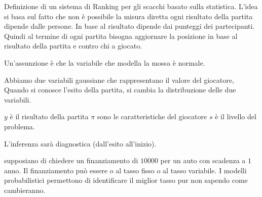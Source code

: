 \begin{esempio}
    Definizione di un sistema di Ranking per gli scacchi basato sulla statistica.
    L'idea si basa sul fatto che non è possibile la misura diretta ogni risultato 
    della partita dipende dalle persone. In base al risultato dipende dai punteggi
    dei partecipanti. Quindi al termine di ogni partita bisogna aggiornare la posizione
    in base al risultato della partita e contro chi a giocato.

    Un'assunzione è che la variabile che modella la mossa è normale.

    Abbiamo due variabili gaussiane che rappresentano il valore del giocatore, Quando
    si conosce l'esito della partita, si cambia la distribuzione delle due variabili.
    
    $y$ è il risultato della partita
    $\pi$ sono le caratteristiche del giocatore
    $s$ è il livello del problema.

    L'inferenza sarà diagnostica (dall'esito all'inizio).
\end{esempio}

\begin{esempio}
    supposiano di chiedere un finanziamento di $10000$ per un auto con scadenza 
    a $1$ anno. Il finanziamento può essere o al tasso fisso o al tasso variabile.
    I modelli probabilistici permettono di identificare il miglior tasso pur non 
    sapendo come cambieranno.
\end{esempio}

